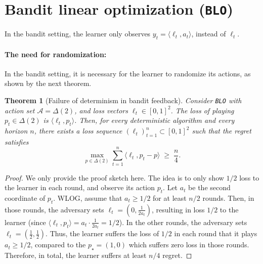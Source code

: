 \documentclass{article}
\theoremstyle{plain}
\newtheorem{theorem}{Theorem}
\theoremstyle{definition}
\newcommand{\cA}{\mathcal A}
\newcommand{\blo}{\texttt{BLO}\xspace}
\begin{document}
\section{Bandit linear optimization (\blo)}
In the bandit setting, the learner only observes $y_t = \langle \ell_t, a_t \rangle$, instead of $\ell_t$.

\paragraph{The need for randomization:}
In the bandit setting, it is necessary for the learner to randomize its actions,
as shown by the next theorem.
\begin{theorem}[Failure of determinism in bandit feedback]
    \label{thm:blo-deterministic}
    Consider \blo with action set $\cA=\Delta(2)$, and loss vectors $\ell_t \in [0,1]^2$.
    The loss of playing $p_t\in\Delta(2)$ is $\langle \ell_t, p_t\rangle$.
    Then, for every deterministic algorithm and every horizon $n$,
    there exists a loss sequence $(\ell_t)_{t=1}^n\subset[0,1]^2$
    such that the regret satisfies
    \[
        \max_{p\in\Delta(2)} \sum_{t=1}^{n}\langle \ell_t, p_t - p \rangle \;\ge\; \frac{n}{4}.
    \]
\end{theorem}
\begin{proof}
    We only provide the proof sketch here.
    The idea is to only show $1/2$ loss to the learner in each round,
    and observe its action $p_t$.
    Let $a_t$ be the second coordinate of $p_t$.
    WLOG, assume that $a_t \geq 1/2$ for at least $n/2$ rounds.
    Then, in those rounds, the adversary sets $\ell_t = (0,\frac{1}{2 a_t})$,
    resulting in loss $1/2$ to the learner (since $\langle \ell_t, p_t \rangle = a_t \cdot \frac{1}{2 a_t} = 1/2$).
    In the other rounds, the adversary sets $\ell_t = (\frac{1}{2},\frac{1}{2})$.
    Thus, the learner suffers the loss of $1/2$ in each round that it plays $a_t \geq 1/2$,
    compared to the $p_\star = (1,0)$ which suffers zero loss in those rounds.
    Therefore, in total, the learner suffers at least $n/4$ regret.
\end{proof}
\end{document}
